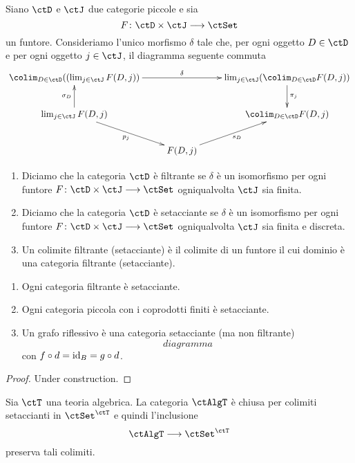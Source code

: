 \begin{definition}\label{def_filtr_sift}
Siano $\ctD$ e $\ctJ$ due categorie piccole e sia 
\[
  F \colon \ctD \times \ctJ \fun \ctSet 
\]
un funtore. Consideriamo l'unico morfismo $\delta$ tale che, per ogni oggetto $D \in \ctD$ e per ogni oggetto $j \in \ctJ$, il diagramma
seguente commuta
$$\xymatrix{\colim_{D \in \ctD}((\lim_{j \in \ctJ}F(D,j)) \ar[rr]^-{\delta} & & \lim_{j \in \ctJ}(\colim_{D \in \ctD}F(D,j)) \ar[d]^{\pi_j} \\
\lim_{j \in \ctJ}F(D,j) \ar[u]^{\sigma_D} \ar[rd]_{p_j} & & \colim_{D \in \ctD}F(D,j) \\
& F(D,j) \ar[ru]_{s_D} }$$
\begin{enumerate}
\item Diciamo che la categoria $\ctD$ è filtrante se $\delta$ è un isomorfismo per ogni funtore $F \colon \ctD \times \ctJ \fun \ctSet$ 
ogniqualvolta $\ctJ$ sia finita.
\item Diciamo che la categoria $\ctD$ è setacciante se $\delta$ è un isomorfismo per ogni funtore $F \colon \ctD \times \ctJ \fun \ctSet$ 
ogniqualvolta $\ctJ$ sia finita e discreta.
\item Un colimite filtrante (setacciante) è il colimite di un funtore il cui dominio è una categoria filtrante (setacciante).
\end{enumerate}
\end{definition}

\begin{examples}\label{esempi_cat_fltr_set}
\hfill
\begin{enumerate}
\item Ogni categoria filtrante è setacciante.
\item Ogni categoria piccola con i coprodotti finiti è setacciante.
\item Un grafo riflessivo è una categoria setacciante (ma non filtrante)
\[
  diagramma 
\]
con $f \circ d = \mathrm{id}_B = g \circ d$.
\end{enumerate}
\end{examples}

\begin{proof}
Under construction.
\end{proof}

\begin{proposition}\label{prop_colim_sift_AlgT}
Sia $\ctT$ una teoria algebrica. La categoria $\ctAlgT$ è chiusa per colimiti setaccianti in $\ctSet^{\ctT}$ e quindi l'inclusione
\[
  \ctAlgT \fun \ctSet^{\ctT} 
\]
preserva tali colimiti.
\end{proposition}

